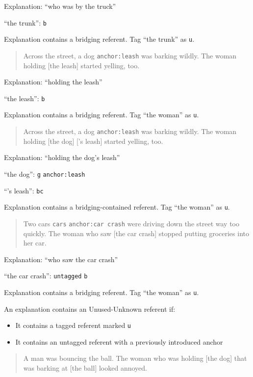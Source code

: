 \documentclass[
]{book}
\providecommand{\tightlist}{%
  \setlength{\itemsep}{0pt}\setlength{\parskip}{0pt}}
\begin{document}
Explanation: ``who was by the truck''

``the trunk'': \texttt{b}

Explanation contains a bridging referent.
Tag ``the trunk'' as \texttt{u}.

\begin{quote}
Across the street, a dog \texttt{anchor:leash} was barking wildly.
The woman holding {[}the leash{]} started yelling, too.
\end{quote}

Explanation: ``holding the leash''

``the leash'': \texttt{b}

Explanation contains a bridging referent.
Tag ``the woman'' as \texttt{u}.

\begin{quote}
Across the street, a dog \texttt{anchor:leash} was barking wildly.
The woman holding {[}the dog{]} {[}'s leash{]} started yelling, too.
\end{quote}

Explanation: ``holding the dog's leash''

``the dog'': \texttt{g} \texttt{anchor:leash}

``'s leash'': \texttt{bc}

Explanation contains a bridging-contained referent.
Tag ``the woman'' as \texttt{u}.

\begin{quote}
Two cars \texttt{cars} \texttt{anchor:car\ crash} were driving down the street way too quickly.
The woman who saw {[}the car crash{]} stopped putting groceries into her car.
\end{quote}

Explanation: ``who saw the car crash''

``the car crash'': \texttt{untagged} \texttt{b}

Explanation contains a bridging referent.
Tag ``the woman'' as \texttt{u}.

An explanation contains an Unused-Unknown referent if:

\begin{itemize}
\tightlist
\item
  It contains a tagged referent marked \texttt{u}
\item
  It contains an untagged referent with a previously introduced anchor
\end{itemize}

\begin{quote}
A man was bouncing the ball.
The woman who was holding {[}the dog{]} that was barking at {[}the ball{]}
looked annoyed.
\end{quote}
\end{document}
